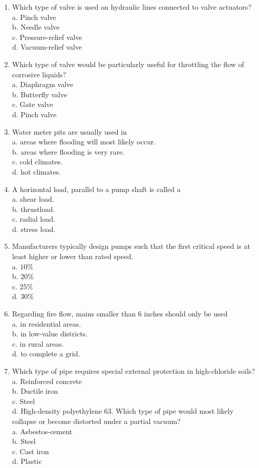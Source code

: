 \documentclass[10pt]{article}
\begin{document}
\begin{enumerate}
  \item Which type of valve is used on hydraulic lines connected to valve actuators?\\
a. Pinch valve\\
b. Needle valve\\
c. Pressure-relief valve\\
d. Vacuum-relief valve

  \item Which type of valve would be particularly useful for throttling the flow of corrosive liquids?\\
a. Diaphragm valve\\
b. Butterfly valve\\
c. Gate valve\\
d. Pinch valve

  \item Water meter pits are usually used in\\
a. areas where flooding will most likely occur.\\
b. areas where flooding is very rare.\\
c. cold climates.\\
d. hot climates.

  \item A horizontal load, parallel to a pump shaft is called a\\
a. shear load.\\
b. thrustload.\\
c. radial load.\\
d. stress load.

  \item Manufacturers typically design pumps such that the first critical speed is at least higher or lower than rated speed.\\
a. $10 \%$\\
b. $20 \%$\\
c. $25 \%$\\
d. $30 \%$

  \item Regarding fire flow, mains smaller than 6 inches should only be used\\
a. in residential areas.\\
b. in low-value districts.\\
c. in rural areas.\\
d. to complete a grid.

  \item Which type of pipe requires special external protection in high-chloride soils?\\
a. Reinforced concrete\\
b. Ductile iron\\
c. Steel\\
d. High-density polyethylene 63. Which type of pipe would most likely collapse or become distorted under a partial vacuum?\\
a. Asbestos-cement\\
b. Steel\\
c. Cast iron\\
d. Plastic


\end{enumerate}
\end{document}
